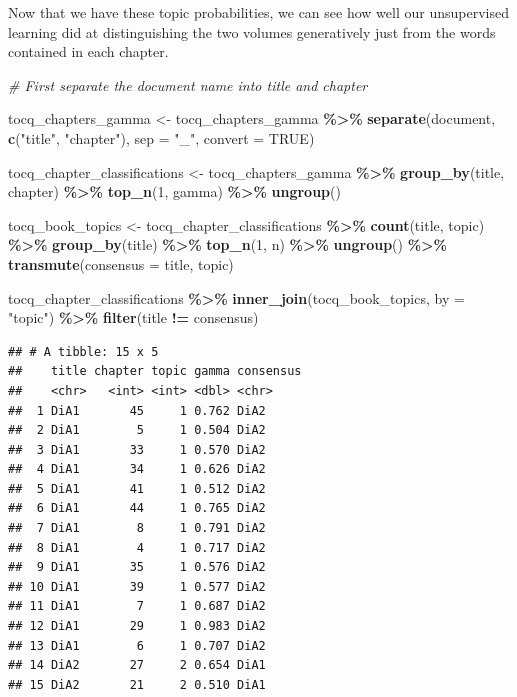 \documentclass[
]{article}
\newenvironment{Shaded}{\begin{snugshade}}{\end{snugshade}}
\newcommand{\AttributeTok}[1]{\textcolor[rgb]{0.13,0.29,0.53}{#1}}
\newcommand{\CommentTok}[1]{\textcolor[rgb]{0.56,0.35,0.01}{\textit{#1}}}
\newcommand{\ConstantTok}[1]{\textcolor[rgb]{0.56,0.35,0.01}{#1}}
\newcommand{\DecValTok}[1]{\textcolor[rgb]{0.00,0.00,0.81}{#1}}
\newcommand{\FunctionTok}[1]{\textcolor[rgb]{0.13,0.29,0.53}{\textbf{#1}}}
\newcommand{\NormalTok}[1]{#1}
\newcommand{\OtherTok}[1]{\textcolor[rgb]{0.56,0.35,0.01}{#1}}
\newcommand{\SpecialCharTok}[1]{\textcolor[rgb]{0.81,0.36,0.00}{\textbf{#1}}}
\newcommand{\StringTok}[1]{\textcolor[rgb]{0.31,0.60,0.02}{#1}}
\begin{document}
Now that we have these topic probabilities, we can see how well our
unsupervised learning did at distinguishing the two volumes generatively
just from the words contained in each chapter.

\begin{Shaded}
\begin{Highlighting}[]
\CommentTok{\# First separate the document name into title and chapter}

\NormalTok{tocq\_chapters\_gamma }\OtherTok{\textless{}{-}}\NormalTok{ tocq\_chapters\_gamma }\SpecialCharTok{\%\textgreater{}\%}
  \FunctionTok{separate}\NormalTok{(document, }\FunctionTok{c}\NormalTok{(}\StringTok{"title"}\NormalTok{, }\StringTok{"chapter"}\NormalTok{), }\AttributeTok{sep =} \StringTok{"\_"}\NormalTok{, }\AttributeTok{convert =} \ConstantTok{TRUE}\NormalTok{)}

\NormalTok{tocq\_chapter\_classifications }\OtherTok{\textless{}{-}}\NormalTok{ tocq\_chapters\_gamma }\SpecialCharTok{\%\textgreater{}\%}
  \FunctionTok{group\_by}\NormalTok{(title, chapter) }\SpecialCharTok{\%\textgreater{}\%}
  \FunctionTok{top\_n}\NormalTok{(}\DecValTok{1}\NormalTok{, gamma) }\SpecialCharTok{\%\textgreater{}\%}
  \FunctionTok{ungroup}\NormalTok{()}

\NormalTok{tocq\_book\_topics }\OtherTok{\textless{}{-}}\NormalTok{ tocq\_chapter\_classifications }\SpecialCharTok{\%\textgreater{}\%}
  \FunctionTok{count}\NormalTok{(title, topic) }\SpecialCharTok{\%\textgreater{}\%}
  \FunctionTok{group\_by}\NormalTok{(title) }\SpecialCharTok{\%\textgreater{}\%}
  \FunctionTok{top\_n}\NormalTok{(}\DecValTok{1}\NormalTok{, n) }\SpecialCharTok{\%\textgreater{}\%}
  \FunctionTok{ungroup}\NormalTok{() }\SpecialCharTok{\%\textgreater{}\%}
  \FunctionTok{transmute}\NormalTok{(}\AttributeTok{consensus =}\NormalTok{ title, topic)}

\NormalTok{tocq\_chapter\_classifications }\SpecialCharTok{\%\textgreater{}\%}
  \FunctionTok{inner\_join}\NormalTok{(tocq\_book\_topics, }\AttributeTok{by =} \StringTok{"topic"}\NormalTok{) }\SpecialCharTok{\%\textgreater{}\%}
  \FunctionTok{filter}\NormalTok{(title }\SpecialCharTok{!=}\NormalTok{ consensus)}
\end{Highlighting}
\end{Shaded}

\begin{verbatim}
## # A tibble: 15 x 5
##    title chapter topic gamma consensus
##    <chr>   <int> <int> <dbl> <chr>    
##  1 DiA1       45     1 0.762 DiA2     
##  2 DiA1        5     1 0.504 DiA2     
##  3 DiA1       33     1 0.570 DiA2     
##  4 DiA1       34     1 0.626 DiA2     
##  5 DiA1       41     1 0.512 DiA2     
##  6 DiA1       44     1 0.765 DiA2     
##  7 DiA1        8     1 0.791 DiA2     
##  8 DiA1        4     1 0.717 DiA2     
##  9 DiA1       35     1 0.576 DiA2     
## 10 DiA1       39     1 0.577 DiA2     
## 11 DiA1        7     1 0.687 DiA2     
## 12 DiA1       29     1 0.983 DiA2     
## 13 DiA1        6     1 0.707 DiA2     
## 14 DiA2       27     2 0.654 DiA1     
## 15 DiA2       21     2 0.510 DiA1
\end{verbatim}
\end{document}
